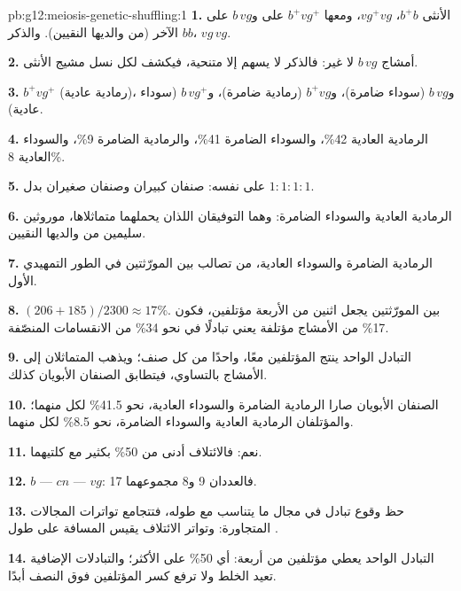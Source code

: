\begin{solution}{pb:g12:meiosis-genetic-shuffling:1}
\textbf{1.} الأنثى $b^+b$، $vg^+vg$، ومعها $b^+vg^+$ على  و$b\,vg$
على الآخر (من والديها النقيين). والذكر $bb$، $vg\,vg$.

\textbf{2.} أمشاج $b\,vg$ لا غير: فالذكر لا يسهم إلا  متنحية،
فيكشف  لكل نسل مشيج الأنثى.

\textbf{3.} $b^+vg^+$ (رمادية عادية)، و$b\,vg$ (سوداء ضامرة)،
و$b^+vg$ (رمادية ضامرة)، و$b\,vg^+$ (سوداء عادية).

\textbf{4.} الرمادية العادية 42\%، والسوداء الضامرة 41\%، والرمادية
الضامرة 9\%، والسوداء العادية 8\%.

\textbf{5.} على  نفسه: صنفان كبيران وصنفان صغيران بدل
$1:1:1:1$.

\textbf{6.} الرمادية العادية والسوداء الضامرة: وهما التوفيقان اللذان
يحملهما متماثلاها، موروثين سليمين من والديها النقيين.

\textbf{7.} الرمادية الضامرة والسوداء العادية، من تصالب بين المورّثتين
في الطور التمهيدي الأول.

\textbf{8.} $(206 + 185)/2300 \approx 17\%$.  بين المورّثتين
يجعل اثنين من  الأربعة مؤتلفين، فكون 17\% من الأمشاج مؤتلفة
يعني تبادلًا في نحو 34\% من الانقسامات المنصّفة.

\textbf{9.} التبادل الواحد ينتج  المؤتلفين معًا، واحدًا من كل
صنف؛ ويذهب المتماثلان إلى الأمشاج بالتساوي، فيتطابق الصنفان الأبويان
كذلك.

\textbf{10.} الصنفان الأبويان صارا الرمادية الضامرة والسوداء العادية،
نحو 41.5\% لكل منهما؛ والمؤتلفان الرمادية العادية والسوداء الضامرة،
نحو 8.5\% لكل منهما.

\textbf{11.} نعم: فالائتلاف أدنى من 50\% بكثير مع كلتيهما.

\textbf{12.} $b$ --- $cn$ --- $vg$: فالعددان 9 و8 مجموعهما 17.

\textbf{13.} حظ وقوع تبادل في مجال ما يتناسب مع طوله، فتتجامع تواترات
المجالات المتجاورة: وتواتر الائتلاف يقيس المسافة على طول .

\textbf{14.} التبادل الواحد يعطي  مؤتلفين من أربعة: أي 50\% على
الأكثر؛ والتبادلات الإضافية تعيد الخلط ولا ترفع كسر المؤتلفين فوق
النصف أبدًا.


\end{solution}
